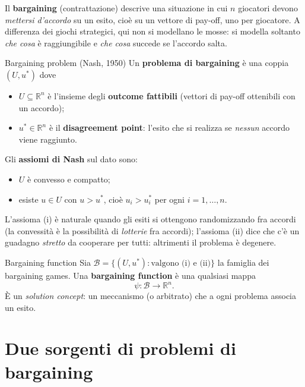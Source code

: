 \documentclass[12pt,a4paper,twoside]{book}
\theoremstyle{plain}
\theoremstyle{definition}
\begin{document}
Il \textbf{bargaining} (contrattazione) descrive una situazione in cui $n$ giocatori devono
\emph{mettersi d'accordo} su un esito, cioè su un vettore di pay-off, uno per giocatore.
A differenza dei giochi strategici, qui non si modellano le mosse: si modella soltanto
\emph{che cosa} è raggiungibile e \emph{che cosa} succede se l'accordo salta.

\begin{defbox}{Bargaining problem (Nash, 1950)}
Un \textbf{problema di bargaining} è una coppia $(U,u^*)$ dove
\begin{itemize}
  \item $U\subseteq\mathbb{R}^n$ è l'insieme degli \textbf{outcome fattibili} (vettori di pay-off
        ottenibili con un accordo);
  \item $u^*\in\mathbb{R}^n$ è il \textbf{disagreement point}: l'esito che si realizza se
        \emph{nessun} accordo viene raggiunto.
\end{itemize}
Gli \textbf{assiomi di Nash} sul dato sono:
\begin{itemize}
  \item[(i)] $U$ è convesso e compatto;
  \item[(ii)] esiste $u\in U$ con $u>u^*$, cioè $u_i>u^*_i$ per ogni $i=1,\dots,n$.
\end{itemize}
\end{defbox}

L'assioma (i) è naturale quando gli esiti si ottengono randomizzando fra accordi
(la convessità è la possibilità di \emph{lotterie} fra accordi); l'assioma (ii) dice che
c'è un guadagno \emph{stretto} da cooperare per tutti: altrimenti il problema è degenere.

\begin{defbox}{Bargaining function}
Sia $\mathcal{B}=\{(U,u^*) : \text{valgono (i) e (ii)}\}$ la famiglia dei bargaining games.
Una \textbf{bargaining function} è una qualsiasi mappa
\[
  \psi:\mathcal{B}\longrightarrow\mathbb{R}^n .
\]
È un \emph{solution concept}: un meccanismo (o arbitrato) che a ogni problema associa
un esito.
\end{defbox}

\section{Due sorgenti di problemi di bargaining}
\end{document}
